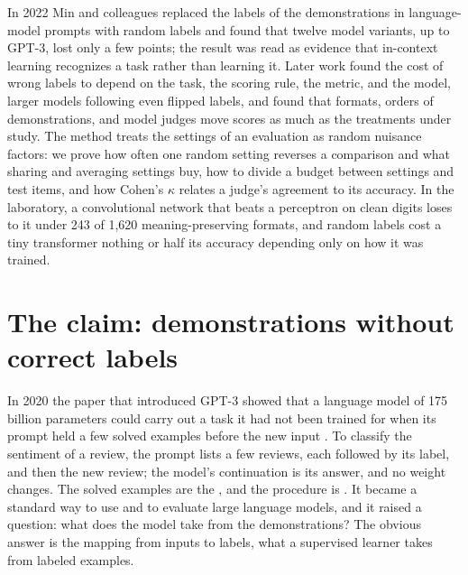 \begin{refsection}
\begin{chaptersummary}
In 2022 Min and colleagues replaced the labels of the demonstrations in language-model prompts with random labels and found that twelve model variants, up to GPT-3, lost only a few points; the result was read as evidence that in-context learning recognizes a task rather than learning it. Later work found the cost of wrong labels to depend on the task, the scoring rule, the metric, and the model, larger models following even flipped labels, and found that formats, orders of demonstrations, and model judges move scores as much as the treatments under study. The method treats the settings of an evaluation as random nuisance factors: we prove how often one random setting reverses a comparison and what sharing and averaging settings buy, how to divide a budget between settings and test items, and how Cohen's $\kappa$ relates a judge's agreement to its accuracy. In the laboratory, a convolutional network that beats a perceptron on clean digits loses to it under 243 of 1,620 meaning-preserving formats, and random labels cost a tiny transformer nothing or half its accuracy depending only on how it was trained.
\end{chaptersummary}

\section{The claim: demonstrations without correct labels}\label{sec:instruments:claim}

In 2020 the paper that introduced GPT-3 showed that a language model of 175 billion parameters could carry out a task it had not been trained for when its prompt held a few solved examples before the new input \parencite{BrownEtAl2020}. To classify the sentiment of a review, the prompt lists a few reviews, each followed by its label, and then the new review; the model's continuation is its answer, and no weight changes. The solved examples are the , and the procedure is . It became a standard way to use and to evaluate large language models, and it raised a question: what does the model take from the demonstrations? The obvious answer is the mapping from inputs to labels, what a supervised learner takes from labeled examples.


\end{refsection}
